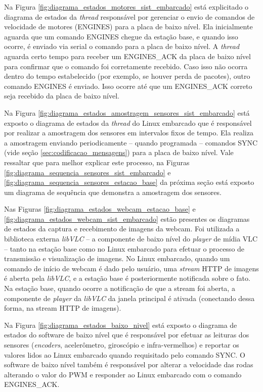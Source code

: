Na Figura \ref{fig:diagrama_estados_motores_sist_embarcado} está explicitado o diagrama de estados da \textit{thread} responsável por gerenciar o envio de comandos de velocidade de motores (ENGINES) para a placa de baixo nível. Ela inicialmente aguarda que um comando ENGINES chegue da estação base, e quando isso ocorre, é enviado via serial o comando para a placa de baixo nível. A \textit{thread} aguarda certo tempo para receber um ENGINES\_ACK da placa de baixo nível para confirmar que o comando foi corretamente recebido. Caso isso não ocorra dentro do tempo estabelecido (por exemplo, se houver perda de pacotes), outro comando ENGINES é enviado. Isso ocorre até que um ENGINES\_ACK correto seja recebido da placa de baixo nível.

Na Figura \ref{fig:diagrama_estados_amostragem_sensores_sist_embarcado} está exposto o diagrama de estados da \textit{thread} do Linux embarcado que é responsável por realizar a amostragem dos sensores em intervalos fixos de tempo. Ela realiza a amostragem enviando periodicamente -- quando programada -- comandos SYNC (vide seção \ref{sec:codificacao_mensagens}) para a placa de baixo nível. Vale ressaltar que para melhor explicar este processo, na Figuras \ref{fig:diagrama_sequencia_sensores_sist_embarcado} e \ref{fig:diagrama_sequencia_sensores_estacao_base} da próxima seção está exposto um diagrama de sequência que demonstra a amostragem dos sensores.

Nas Figuras \ref{fig:diagrama_estados_webcam_estacao_base} e \ref{fig:diagrama_estados_webcam_sist_embarcado} estão presentes os diagramas de estados da captura e recebimento de imagens da webcam. Foi utilizada a biblioteca externa \textit{libVLC} \cite{vlc} -- a componente de baixo nível do \textit{player} de mídia VLC -- tanto na estação base como no Linux embarcado para efetuar o processo de transmissão e visualização de imagens. No Linux embarcado, quando um comando de início de webcam é dado pelo usuário, uma \textit{stream} HTTP de imagens é aberta pela \textit{libVLC}, e a estação base é posteriormente notificada sobre o fato. Na estação base, quando ocorre a notificação de que a stream foi aberta, a componente de \textit{player} da \textit{libVLC} da janela principal é ativada (conectando dessa forma, na stream HTTP de imagens).

Na Figura \ref{fig:diagrama_estados_baixo_nivel} está exposto o diagrama de estados do software de baixo nível que é responsável por efetuar as leituras dos sensores (\textit{encoders}, acelerômetro, giroscópio e infra-vermelhos) e reportar os valores lidos ao Linux embarcado quando requisitado pelo comando SYNC. O software de baixo nível também é responsável por alterar a velocidade das rodas alterando o valor do PWM e responder ao Linux embarcado com o comando ENGINES\_ACK.

